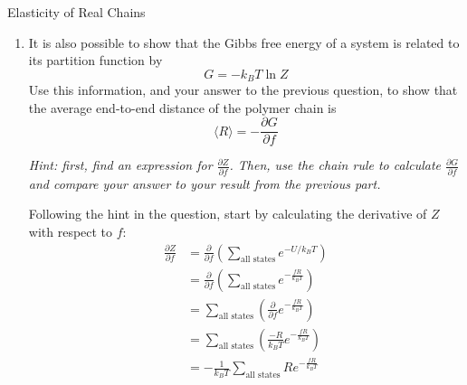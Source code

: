 \begin{activity}[extension]{Elasticity of Real Chains}
\begin{exercises}
\begin{enumerate}
			\emph{Hint: in probability, averages are calculated by multiplying the value that would be measured for a given state by the probability of finding the system in that state, and summing over all possible states.}
			
			\begin{solution}{}
				Per the hint,
				\begin{equation*}
					\langle R \rangle = \frac{1}{Z} \sum_\text{all states} R e^{-U/k_B T}
				\end{equation*}
				Substituting in $U=fR$, we obtain
				\begin{equation*}
					\langle R \rangle = \frac{1}{Z} \sum_\text{all states} R e^{-fR/k_B T}
				\end{equation*}
			\end{solution}
			
		\item It is also possible to show that the Gibbs free energy of a system is related to its partition function by
			\begin{equation*}
				G = -k_B T \ln Z
			\end{equation*}
			Use this information, and your answer to the previous question, to show that the average end-to-end distance of the polymer chain is
			\begin{equation*}
				\langle R \rangle = -\frac{\partial G}{\partial f}
			\end{equation*}
			
			\emph{Hint: first, find an expression for $\frac{\partial Z}{\partial f}$.  Then, use the chain rule to calculate $\frac{\partial G}{\partial f}$ and compare your answer to your result from the previous part.}
			
			\begin{solution}{}
				Following the hint in the question, start by calculating the derivative of $Z$ with respect to $f$:
				\begin{align*}
					\frac{\partial Z}{\partial f} &= \frac{\partial}{\partial f}\left( \sum_\text{all states} e^{-U/k_B T} \right) \\
					&= \frac{\partial}{\partial f}\left( \sum_\text{all states} e^{-\frac{fR}{k_B T}} \right) \\
					&= \sum_\text{all states}\left(\frac{\partial}{\partial f} e^{-\frac{fR}{k_B T}}\right) \\
					&= \sum_\text{all states}\left(\frac{-R}{k_B T} e^{-\frac{fR}{k_B T}}\right) \\
					&= -\frac{1}{k_B T}\sum_\text{all states}R e^{-\frac{fR}{k_B T}}
				\end{align*}
				

\end{solution}
\end{enumerate}
\end{exercises}
\end{activity}
